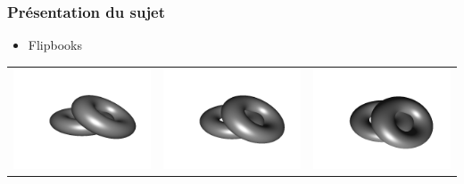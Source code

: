 \documentclass{beamer}
\begin{document}

\begin{frame}
\frametitle{Présentation du sujet}
\begin{itemize}[label=$\bullet$]
\item Flipbooks
\end{itemize}
\begin{tabular}{l|c|r}
\includegraphics[scale=0.15]{flip1.png}
&
\includegraphics[scale=0.15]{flip2.png}
&
\includegraphics[scale=0.15]{flip3.png}

\end{tabular}
\end{frame}
\end{document}
